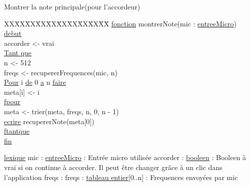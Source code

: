 Montrer la note principale(pour l'accordeur)\newline
\begin{tabbing}
\kill XX\=XX\=XX\=XX\=XX\=XX\=XX\=XX\=XX\=XX\=
\kill
\ul{fonction} montrerNote(mic : \ul{entreeMicro})\\
\ul{debut}\\
\>accorder <- vrai\\
\>\ul{Tant que}\\
    \>\>n <- 512\\
    \>\>freqs <- recupererFrequences(mic, n)\\
    \>\>\ul{Pour} i \ul{de} 0 \ul{a} n \ul{faire}\\
        \>\>\>meta[i] <- i\\
    \>\>\ul{fpour}\\
    \>\>meta <- trier(meta, freqs, n, 0, n - 1)\\
    \>\>\ul{ecrire} recupererNote(meta[0])\\
\>\ul{ftantque}\\
\ul{fin}\\
\end{tabbing}

\ul{lexique}\newline
mic : \ul{entreeMicro} : Entrée micro utilisée\newline
accorder : \ul{booleen} : Booleen à vrai si on continue à accorder. Il peut être changer grâce à un clic dans l'application\newline
freqs : freqs : \ul{tableau entier}[0..n] : Frequences envoyées par mic\newline
\newline

